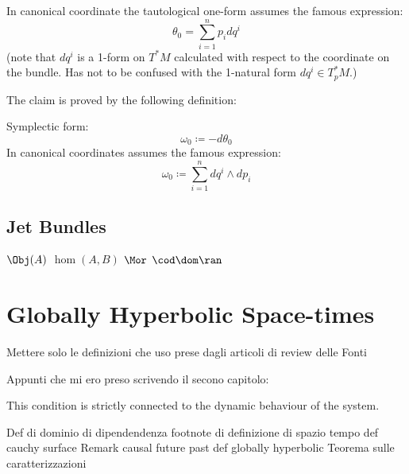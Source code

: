 \documentclass[Main]{subfiles}
\begin{document}
					\begin{observation}
						In canonical coordinate the tautological one-form assumes the famous expression:
						\begin{displaymath}
							\theta_0 = \sum_{i=1}^n {p_i} d q^i
						\end{displaymath}
						(note that $d q^i$ is a 1-form on $T^*M$ calculated with respect to the coordinate on the bundle. Has not to be confused with the 1-natural form $d q^i \in T^*_p M$.)
					\end{observation}
	
					The claim is proved by the following definition:
					\begin{definition}
						Symplectic form:
						\begin{displaymath}
							\omega_0 \coloneqq -d \theta_0
						\end{displaymath}
						In canonical coordinates assumes the famous expression:
						\begin{displaymath}
							\omega_0 \coloneqq \sum_{i=1}^n  d q^i \wedge d p_i
						\end{displaymath}
					\end{definition}
					
		\subsection{Jet Bundles}
			$\Obj (A)$			
			$\hom(A,B)$
			$\Mor$
			$\cod \dom \ran$
	\section{Globally Hyperbolic Space-times}
			\begin{Warning}
				Mettere solo le definizioni che uso prese dagli articoli di review delle Fonti
			\end{Warning}	
			Appunti che mi ero preso scrivendo il secono capitolo:
					
			This condition is strictly connected to the dynamic behaviour of the system.
			
			\begin{Warning}
			Def di dominio di dipendendenza
			footnote di definizione di spazio tempo
			def cauchy surface
			Remark causal future past
			def globally hyperbolic
			Teorema sulle caratterizzazioni
			\end{Warning}			
			
\end{document}
